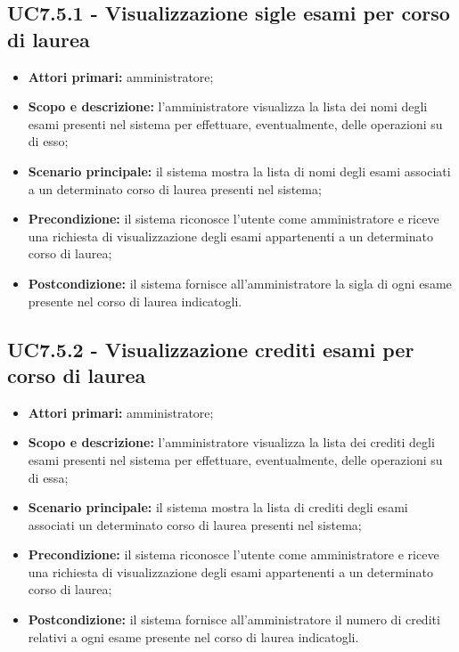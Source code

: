 \documentclass[AnalisiDeiRequisiti.tex]{subfiles}
\begin{document}
\subsection{UC7.5.1 - Visualizzazione sigle esami per corso di laurea}
\begin{itemize}
	\item \textbf{Attori primari:} amministratore;
	\item \textbf{Scopo e descrizione:} l'amministratore visualizza la lista dei nomi degli esami presenti nel sistema per effettuare, eventualmente, delle operazioni su di esso;
	\item \textbf{Scenario principale:} il sistema mostra la lista di nomi degli esami associati a un determinato corso di laurea presenti nel sistema;
	\item \textbf{Precondizione:} il sistema riconosce l'utente come amministratore e riceve una richiesta di visualizzazione degli esami appartenenti a un determinato corso di laurea; 
	\item \textbf{Postcondizione:} il sistema fornisce all'amministratore la sigla di ogni esame presente nel corso di laurea indicatogli.
\end{itemize}
\subsection{UC7.5.2 - Visualizzazione crediti esami per corso di laurea}
\begin{itemize}
	\item \textbf{Attori primari:} amministratore;
	\item \textbf{Scopo e descrizione:} l'amministratore visualizza la lista dei crediti degli esami presenti nel sistema per effettuare, eventualmente, delle operazioni su di essa;
	\item \textbf{Scenario principale:} il sistema mostra la lista di crediti degli esami associati  un determinato corso di laurea presenti nel sistema;
	\item \textbf{Precondizione:} il sistema riconosce l'utente come amministratore e riceve una richiesta di visualizzazione degli esami appartenenti a un determinato corso di laurea; 
	\item \textbf{Postcondizione:} il sistema fornisce all'amministratore il numero di crediti relativi a ogni esame presente nel corso di laurea indicatogli.
\end{itemize}
\end{document}
